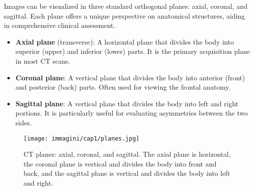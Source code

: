 Images can be visualized in three standard orthogonal planes: axial, coronal, and sagittal. Each plane offers a unique perspective on anatomical structures, aiding in comprehensive clinical assessment.

\begin{itemize}
    \item \textbf{Axial plane} (transverse): A horizontal plane that divides the body into superior (upper) and inferior (lower) parts. It is the primary acquisition plane in most CT scans.
    
    \item \textbf{Coronal plane}: A vertical plane that divides the body into anterior (front) and posterior (back) parts. Often used for viewing the frontal anatomy.
    
    \item \textbf{Sagittal plane}: A vertical plane that divides the body into left and right portions. It is particularly useful for evaluating asymmetries between the two sides.
\end{itemize}

\begin{figure}[h!]
    \centering
    \texttt{[image: immagini/cap1/planes.jpg]}
    \caption{CT planes: axial, coronal, and sagittal. The axial plane is horizontal, the coronal plane is vertical and divides the body into front and back, and the sagittal plane is vertical and divides the body into left and right.}
    \label{fig:ct_planes}
\end{figure}
